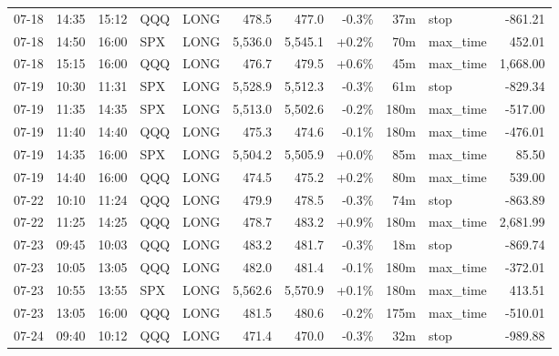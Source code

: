 \documentclass[11pt,a4paper,twoside]{article}
\begin{document}
\begin{center}
\begin{longtable}{>{\color{txtmain}}l l l l l r r r r >{\color{txtmain}}l r}
07-18 & 14:35 & 15:12 & QQQ & LONG & 478.5 & 477.0 & \textcolor{lossred}{-0.3\%} & 37m & stop & \textcolor{lossred}{-861.21} \\
07-18 & 14:50 & 16:00 & SPX & LONG & 5,536.0 & 5,545.1 & \textcolor{wingreen}{+0.2\%} & 70m & max\_time & \textcolor{wingreen}{452.01} \\
07-18 & 15:15 & 16:00 & QQQ & LONG & 476.7 & 479.5 & \textcolor{wingreen}{+0.6\%} & 45m & max\_time & \textcolor{wingreen}{1,668.00} \\
07-19 & 10:30 & 11:31 & SPX & LONG & 5,528.9 & 5,512.3 & \textcolor{lossred}{-0.3\%} & 61m & stop & \textcolor{lossred}{-829.34} \\
07-19 & 11:35 & 14:35 & SPX & LONG & 5,513.0 & 5,502.6 & \textcolor{lossred}{-0.2\%} & 180m & max\_time & \textcolor{lossred}{-517.00} \\
07-19 & 11:40 & 14:40 & QQQ & LONG & 475.3 & 474.6 & \textcolor{lossred}{-0.1\%} & 180m & max\_time & \textcolor{lossred}{-476.01} \\
07-19 & 14:35 & 16:00 & SPX & LONG & 5,504.2 & 5,505.9 & \textcolor{wingreen}{+0.0\%} & 85m & max\_time & \textcolor{wingreen}{85.50} \\
07-19 & 14:40 & 16:00 & QQQ & LONG & 474.5 & 475.2 & \textcolor{wingreen}{+0.2\%} & 80m & max\_time & \textcolor{wingreen}{539.00} \\
07-22 & 10:10 & 11:24 & QQQ & LONG & 479.9 & 478.5 & \textcolor{lossred}{-0.3\%} & 74m & stop & \textcolor{lossred}{-863.89} \\
07-22 & 11:25 & 14:25 & QQQ & LONG & 478.7 & 483.2 & \textcolor{wingreen}{+0.9\%} & 180m & max\_time & \textcolor{wingreen}{2,681.99} \\
07-23 & 09:45 & 10:03 & QQQ & LONG & 483.2 & 481.7 & \textcolor{lossred}{-0.3\%} & 18m & stop & \textcolor{lossred}{-869.74} \\
07-23 & 10:05 & 13:05 & QQQ & LONG & 482.0 & 481.4 & \textcolor{lossred}{-0.1\%} & 180m & max\_time & \textcolor{lossred}{-372.01} \\
07-23 & 10:55 & 13:55 & SPX & LONG & 5,562.6 & 5,570.9 & \textcolor{wingreen}{+0.1\%} & 180m & max\_time & \textcolor{wingreen}{413.51} \\
07-23 & 13:05 & 16:00 & QQQ & LONG & 481.5 & 480.6 & \textcolor{lossred}{-0.2\%} & 175m & max\_time & \textcolor{lossred}{-510.01} \\
07-24 & 09:40 & 10:12 & QQQ & LONG & 471.4 & 470.0 & \textcolor{lossred}{-0.3\%} & 32m & stop & \textcolor{lossred}{-989.88} \\

\end{longtable}
\end{center}
\end{document}
